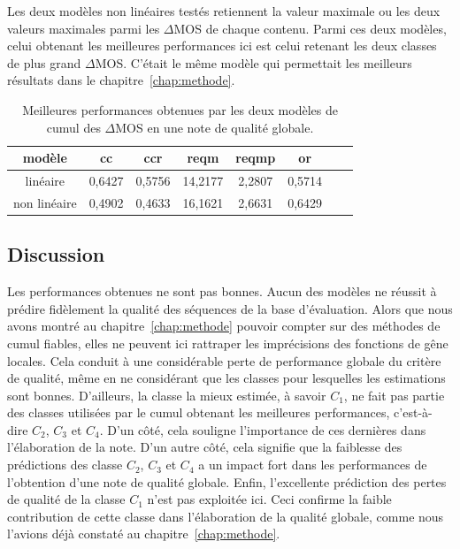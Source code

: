 Les deux modèles non linéaires testés retiennent la valeur maximale ou les deux valeurs maximales parmi les $\Delta$MOS de chaque contenu. Parmi ces deux modèles, celui obtenant les meilleures performances ici est celui retenant les deux classes de plus grand $\Delta$MOS. C'était le même modèle qui permettait les meilleurs résultats dans le chapitre~\ref{chap:methode}.

\begin{table}[htbp]
\centering
\begin{tabular}{cccccccc}\toprule
\textbf{modèle}	& \textbf{cc}	& \textbf{ccr}	& \textbf{reqm}	& \textbf{reqmp}	& \textbf{or}		\\ \toprule
linéaire					& 0,6427			& 0,5756			& 14,2177			& 2,2807				& 0,5714				\\ \midrule
non linéaire			& 0,4902			& 0,4633			& 16,1621			& 2,6631				& 0,6429				\\ \bottomrule
\end{tabular}
\caption{Meilleures performances obtenues par les deux modèles de cumul des $\Delta$MOS en une note de qualité globale.}
\label{tab:MeilleuresModeles}
\end{table}


\subsection{Discussion}
Les performances obtenues ne sont pas bonnes. Aucun des modèles ne réussit à prédire fidèlement la qualité des séquences de la base d'évaluation. Alors que nous avons montré au chapitre~\ref{chap:methode} pouvoir compter sur des méthodes de cumul fiables, elles ne peuvent ici rattraper les imprécisions des fonctions de gêne locales. Cela conduit à une considérable perte de performance globale du critère de qualité, même en ne considérant que les classes pour lesquelles les estimations sont bonnes. D'ailleurs, la classe la mieux estimée, à savoir $C_1$, ne fait pas partie des classes utilisées par le cumul obtenant les meilleures performances, c'est-à-dire $C_2$, $C_3$ et $C_4$. D'un côté, cela souligne l'importance de ces dernières dans l'élaboration de la note. D'un autre côté, cela signifie que la faiblesse des prédictions des classe $C_2$, $C_3$ et $C_4$ a un impact fort dans les performances de l'obtention d'une note de qualité globale. Enfin, l'excellente prédiction des pertes de qualité de la classe $C_1$ n'est pas exploitée ici. Ceci confirme la faible contribution de cette classe dans l'élaboration de la qualité globale, comme nous l'avions déjà constaté au chapitre~\ref{chap:methode}.

